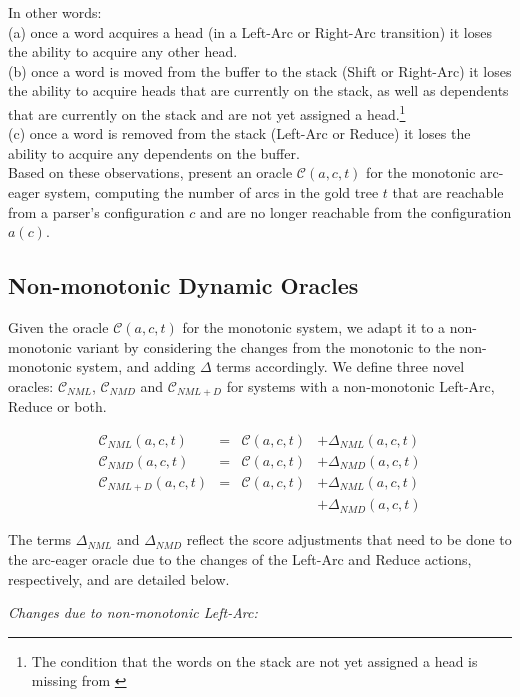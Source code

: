 \documentclass[11pt,letterpaper]{article}
\begin{document}
\noindent In other words:\\
(a) once a word acquires a head (in a Left-Arc or Right-Arc transition) it loses the ability to acquire
any other head.\\
(b) once a word is moved from the buffer to the stack (Shift or Right-Arc) it loses the ability to
acquire heads that are currently on the stack, as well as dependents that are
currently on the stack and are not yet assigned a head.\footnote{The condition
that the words on the stack are not yet assigned a head is missing from
\citep{goldberg:12}}\\
(c) once a word is removed from the stack (Left-Arc or Reduce) it loses the
ability to acquire any dependents on the buffer.\\
Based on these observations, \citet{goldberg:12} present an oracle
$\mathcal{C}(a,c,t)$ for the monotonic arc-eager system, computing the number
of arcs in the gold tree $t$ that are reachable from a parser's configuration
$c$ and are no longer reachable from the configuration $a(c)$.

\subsection{Non-monotonic Dynamic Oracles}

Given the oracle $\mathcal{C}(a,c,t)$ for the monotonic system,
we adapt it to a non-monotonic variant by considering the changes from the
monotonic to the non-monotonic system, and adding $\Delta$ terms accordingly.
We define three novel oracles: $\mathcal{C}_{NML}$, $\mathcal{C}_{NMD}$ and
$\mathcal{C}_{NML+D}$ for systems with a non-monotonic Left-Arc, Reduce or both.

\[\begin{array}{lcll} 
\mathcal{C}_{NML}(a,c,t)& = &\mathcal{C}(a,c,t)&+ \Delta_{NML}(a,c,t)\\
\mathcal{C}_{NMD}(a,c,t)& = &\mathcal{C}(a,c,t)&+ \Delta_{NMD}(a,c,t)\\
\mathcal{C}_{NML+D}(a,c,t)& = &\mathcal{C}(a,c,t)&+ \Delta_{NML}(a,c,t)\\ 
                                     &  & &+ \Delta_{NMD}(a,c,t)
\end{array}\]

The terms $\Delta_{NML}$ and $\Delta_{NMD}$ reflect the score adjustments that
need to be done to the arc-eager oracle due to the changes of the Left-Arc and
Reduce actions, respectively, and are detailed below.

\noindent \emph{Changes due to non-monotonic Left-Arc:}
\end{document}
